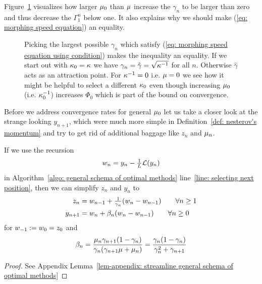 %
Figure~\ref{fig: gamma path}
visualizes how larger \(\mu_0\) than \(\mu\) increase the \(\gamma_n\)
to be larger than zero and thus decrease the \(\Gamma_1^n\) below one. It also
explains why we should make (\ref{eq: morphing speed equation}) an equality.
%
\begin{figure}[h]
	\centering
	\def\svgwidth{1\textwidth}
	
	\caption{
		Picking the largest possible \(\gamma_n\) which satisfy (\ref{eq:
		morphing speed equation using condition}) makes the inequality an
		equality. If we start out with \(\kappa_0=\kappa\) we have
		\(\gamma_n=\hat{\gamma}=\sqrt{\kappa^{-1}}\) for all \(n\).
		Otherwise \(\hat{\gamma}\) acts as an attraction point.
		For \(\kappa^{-1}=0\) i.e. \(\mu=0\)
		we see how it might be helpful to select a different \(\kappa_0\)
		even though increasing \(\mu_0\) (i.e. \(\kappa_0^{-1}\))
		increases \(\Phi_0\) which is part of the bound on convergence.
	}
	\label{fig: gamma path}
\end{figure}

Before we address convergence rates for general \(\mu_0\) let us take a
closer look at the strange looking \(y_{n+1}\), which were much more simple in
Definition~\ref{def: nesterov's momentum} and try to get rid of 
additional baggage like \(z_n\) and \(\mu_n\).

\begin{lemma}\label{lem: streamline general schema of optimal methods}
	If we use the recursion
	\begin{align}\label{eq-lem-assmpt: weigth recursion}
		w_n = y_n - \tfrac1{L}\mathcal{L}(y_n)
	\end{align}
	in Algorithm~\ref{algo: general schema of optimal methods} line~\ref{line:
	selecting next position}, then we can simplify \(z_n\) and \(y_n\)
	to
	\begin{align}
		z_n
		&= w_{n-1} + \tfrac1{\gamma_n}(w_n-w_{n-1})
		\qquad \forall n\ge 1\\
		y_{n+1}
		&=w_n + \beta_n(w_n-w_{n-1}) \qquad \forall n\ge 0
	\end{align}
	for \(w_{-1}:=w_0=z_0\) and
	\begin{align}
		\beta_n
		= \frac{\mu_n \gamma_{n+1}(1-\gamma_n)}{\gamma_n(\gamma_{n+1}\mu +\mu_n)}
		= \frac{\gamma_n(1-\gamma_n)}{\gamma_n^2 + \gamma_{n+1}}
	\end{align}
\end{lemma}
\begin{proof}
	See Appendix Lemma~\ref{lem-appendix: streamline general schema of optimal methods}
\end{proof}

